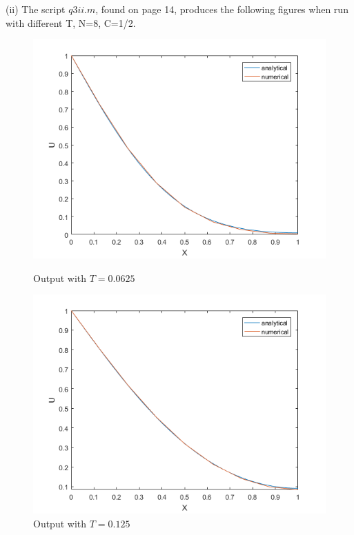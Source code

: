 \documentclass[10pt,a4paper]{report}
\begin{document}
(ii) The script $q3ii.m$, found on page 14, produces the following figures when run with different T, N=8, C=1/2.

\newpage

\begin{figure}[ht]
\begin{minipage}[b]{0.5\linewidth}
\centering
\includegraphics[width=\textwidth]{3ii00625}
\caption{Output with $T=0.0625$}
\end{minipage}
\hspace{0.5cm}
\begin{minipage}[b]{0.5\linewidth}
\centering
\includegraphics[width=\textwidth]{3ii0125}
\caption{Output with $T=0.125$}
\end{minipage}
\end{figure}
\end{document}
